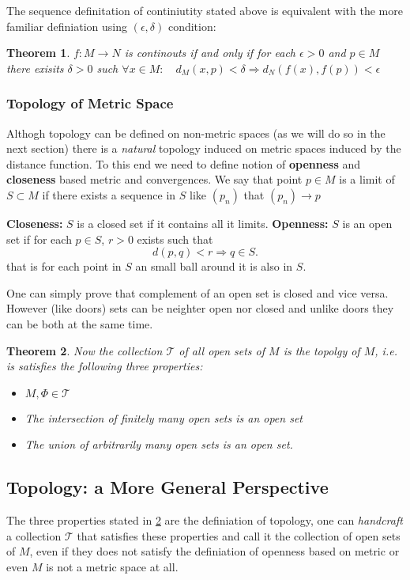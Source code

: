 \documentclass{article}
\newtheorem{theorem}{Theorem}
\begin{document}
The sequence definitation of continiutity stated above is equivalent with the more familiar definiation using $(\epsilon, \delta)$ condition: 
\begin{theorem}
$f:M \to N$ is continouts if and only if for each $\epsilon >0$ and $ p \in M$ there exisits $\delta > 0$ such $\forall x \in M : \quad d_M(x,p) < \delta \Rightarrow d_N(f(x), f(p)) < \epsilon$
\end{theorem}
\subsubsection{Topology of Metric Space} \label{topology1}
Althogh topology can be defined on non-metric spaces (as we will do so in the next section) there is a \textit{natural} topology induced on metric spaces induced by the distance function. To this end we need to define notion of {\bf openness} and {\bf closeness} based metric and convergences. We say that point $p \in M$ is a limit of $S \subset M$ if there exists a  sequence in $S$ like $(p_n)$ that $(p_n) \to p$

{\bf Closeness:} $S$ is a closed set if it contains all it limits. 
{\bf Openness:} $S$ is an open set if for each $p \in S$, $r>0$ exists such that 
\[
d(p,q) <r \Rightarrow q \in S.
\]
that is for each point in $S$ an small ball around it is also in $S$.

One can simply prove that complement of an open set is closed and vice versa. However (like doors) sets can be neighter open nor closed and unlike doors they can be both at the same time. 

\begin{theorem}\label{topdef}
	Now the collection $\mathcal{T}$ of all open sets of $M$ is the topolgy of $M$, i.e. is satisfies the following three properties:
	\begin{itemize}
	\item $M, \Phi \in \mathcal{T}$ 
	\item The intersection of finitely many open sets is an open set	
	\item The union of arbitrarily many open sets is an open set. 
\end{itemize}
\end{theorem}

\subsection{Topology: a More General Perspective} \label{topology2}
The three properties stated in \ref{topdef} are the definiation of topology, one can {\it handcraft} a collection $\mathcal{T}$  that satisfies these properties and call it the collection of open sets of $M$, even if they does not satisfy the definiation of openness based on metric or even $M$ is not a metric space at all. 
\end{document}
